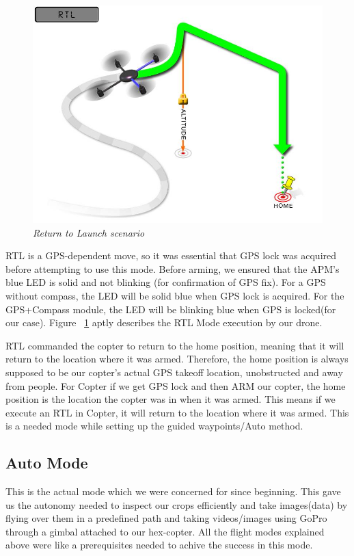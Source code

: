 \begin{figure}[h]
	\includegraphics[width=0.7\linewidth]{RTL}
	\centering
	\caption{\label{fig: RTL}\textit{Return to Launch scenario}}
\end{figure}

RTL is a GPS-dependent move, so it was essential that GPS lock was acquired before attempting to use this mode. Before arming, we ensured that the APM’s blue LED is solid and not blinking (for confirmation of GPS fix). For a GPS without compass, the LED will be solid blue when GPS lock is acquired. For the GPS+Compass module, the LED will be blinking blue when GPS is locked(for our case). Figure ~\ref{fig: RTL} aptly describes the RTL Mode execution by our drone.

RTL commanded the copter to return to the home position, meaning that it will return to the location where it was armed. Therefore, the home position is always supposed to be our copter’s actual GPS takeoff location, unobstructed and away from people. For Copter if we get GPS lock and then ARM our copter, the home position is the location the copter was in when it was armed. This means if we execute an RTL in Copter, it will return to the location where it was armed. This is a needed mode while setting up the guided waypoints/Auto method.

\subsection{Auto Mode}
This is the actual mode which we were concerned for since beginning. This gave us the autonomy needed to inspect our crops efficiently and take images(data) by flying over them in a predefined path and taking videos/images using GoPro through a gimbal attached to our hex-copter. All the flight modes explained above were like a prerequisites needed to achive the success in this mode. 

